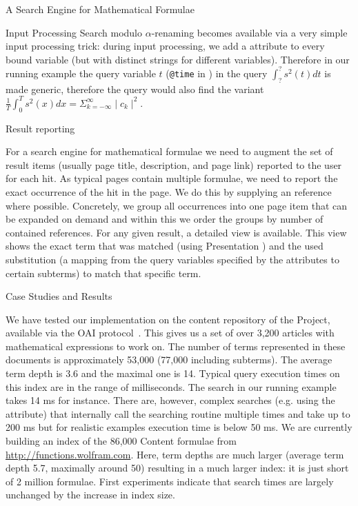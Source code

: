 \begin{omgroup}[id=mathwebsearch,creators={isucan,miko}]{A Search Engine for Mathematical Formulae}
\begin{omgroup}[id=mws.input-processing]{Input Processing}
Search modulo $\alpha$-renaming becomes available via a very simple input processing
trick: during input processing, we add a {} attribute
to every bound variable (but with distinct strings for different variables). Therefore in
our running example the query variable $t$ ({\tt{@time}} in {})
in the query $\int_?^?s^2(t)dt$ is made generic, therefore the query would also find the
variant $\frac{1}{T}\int_0^Ts^2(x)dx = \Sigma_{k=-\infty}^{\infty}\mid c_k\mid^2$.
\end{omgroup}

\begin{omgroup}[id=mws.result-reporting]{Result reporting}

For a search engine for mathematical formulae we need to augment the set of result items
(usually page title, description, and page link) reported to the user for each hit. As
typical pages contain multiple formulae, we need to report the exact occurrence of the hit
in the page. We do this by supplying an {} reference where possible.
Concretely, we group all occurrences into one page item that can be expanded on demand and
within this we order the groups by number of contained references. For any given result, a
detailed view is available.  This view shows the exact term that was matched (using
Presentation {\mathml}) and the used substitution (a mapping from the query variables
specified by the {} attributes to certain subterms) to
match that specific term.
\end{omgroup}

\begin{omgroup}[id=mws.case-study]{Case Studies and Results}

We have tested our implementation on the content repository of the {\connexions} Project,
available via the OAI protocol~\cite{OAI:protocol}. This gives us a set of over 3,200
articles with mathematical expressions to work on. The number of terms represented in
these documents is approximately 53,000 (77,000 including subterms). The average term
depth is 3.6 and the maximal one is 14.  Typical query execution times on this index are
in the range of milliseconds. The search in our running example takes 14 ms for
instance. There are, however, complex searches (e.g. using the
{} attribute) that internally call the searching
routine multiple times and take up to 200 ms but for realistic examples execution time is
below 50 ms. We are currently building an index of the 86,000 Content {\mathml} formulae
from \url{http://functions.wolfram.com}. Here, term depths are much larger (average term
depth 5.7, maximally around 50) resulting in a much larger index: it is just short of 2
million formulae. First experiments indicate that search times are largely unchanged by
the increase in index size.


\end{omgroup}
\end{omgroup}
